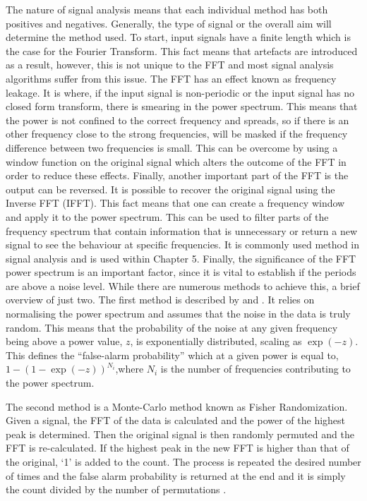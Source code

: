 	The nature of signal analysis means that each individual method has both positives and negatives.
	Generally, the type of signal or the overall aim will determine the method used.
	To start, input signals have a finite length which is the case for the Fourier Transform. 
	This fact means that artefacts are introduced as a result, however, this is not unique to the FFT and most signal analysis algorithms suffer from this issue. 
	The FFT has an effect known as frequency leakage.
    It is where, if the input signal is non-periodic or the input signal has no closed form transform, there is smearing in the power spectrum.
    This means that the power is not confined to the correct frequency and spreads, so if there is an other frequency close to the strong frequencies, will be masked if the frequency difference between two frequencies is small.
	This can be overcome by using a window function on the original signal which alters the outcome of the FFT in order to reduce these effects.	
    Finally, another important part of the FFT is the output can be reversed.
    It is possible to recover the original signal using the Inverse FFT (IFFT).
    This fact means that one can create a frequency window and apply it to the power spectrum.
    This can be used to filter parts of the frequency spectrum that contain information that is unnecessary or return a new signal to see the behaviour at specific frequencies.
    It is commonly used method in signal analysis and is used within Chapter 5.
    Finally, the significance of the FFT power spectrum is an important factor, since it is vital to establish if the periods are above a noise level.
    While there are numerous methods to achieve this, a brief overview of just two.
    The first method is described by \cite{1982ApJ...263..835S} and \cite{1986ApJ...302..757H}.
    It relies on normalising the power spectrum and assumes that the noise in the data is truly random. 
    This means that the probability of the noise at any given frequency being above a power value, $z$, is exponentially distributed, scaling as $\exp(-z)$.
    This defines the ``false-alarm probability'' which at a given power is equal to, $1 - (1 - \exp(-z))^{N_i}$,where $N_i$ is the number of frequencies contributing to the power spectrum.
        
    The second method is a Monte-Carlo method known as Fisher Randomization.
    Given a signal, the FFT of the data is calculated and the power of the highest peak is determined.
    Then the original signal is then randomly permuted and the FFT is re-calculated. If the highest peak in the new FFT is higher than that of the original, `1' is added to the count.
    The process is repeated the desired number of times and the false alarm probability is returned at the end and it is simply the count divided by the number of permutations \citealt{1985AJ.....90.2317L}. 
    
